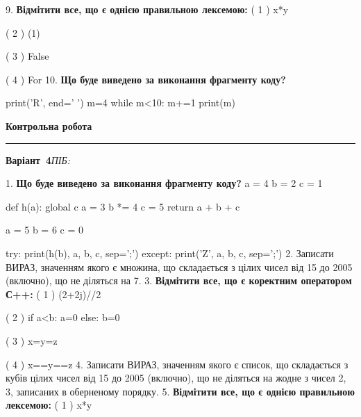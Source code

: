 \documentclass[11pt]{article}
\begin{document}
\vspace{5mm}
9. %
\textbf{Відмітити все, що є однією правильною лексемою:}
( 1 ) x*y

( 2 ) (1)

( 3 ) False

( 4 ) For
\vspace{5mm}
10. \textbf{Що буде виведено за виконання фрагменту коду?}

print('R', end=' ')
m=4
while m<10:
    m+=1
print(m)

\vspace{5mm}










\newpage

\newpage

{\centering\Large\bfseries Контрольна робота\par}
\medskip
\noindent\rule{\linewidth}{0.5pt}
\smallskip
\noindent\textbf{Варіант \No\,4}\hfill \textit{ПІБ:}\,\underline{\hspace{60mm}}
\vspace{4mm}

1. \textbf{Що буде виведено за виконання фрагменту коду?}
a = 4
b = 2
c = 1

def h(a):
global c    a = 3
    b *= 4
    c = 5
    return a + b + c

a = 5
b = 6
c = 0

try:
    print(h(b), a, b, c, sep=';')
except:
    print('Z', a, b, c, sep=';')
\vspace{5mm}
2. 
Записати ВИРАЗ, значенням якого є множина, що складається з цілих чисел від 15 до 2005 (включно), що не діляться на 7.\vspace{5mm}
3. %
\textbf{Відмітити все, що є коректним оператором С++:}
( 1 ) (2+2j)//2

( 2 ) if a<b: a=0 else: b=0

( 3 ) x=y=z

( 4 ) x==y==z
\vspace{5mm}
4. 
Записати ВИРАЗ, значенням якого є список, що складається з кубів цілих чисел від 15 до 2005 (включно), що не діляться на жодне з чисел 2, 3, записаних в оберненому порядку.\vspace{5mm}
5. %
\textbf{Відмітити все, що є однією правильною лексемою:}
( 1 ) x*y
\end{document}
